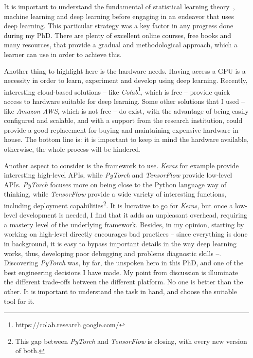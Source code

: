    \par It is important to understand the fundamental of statistical learning theory~\citep{hastie01statisticallearning}, machine learning and deep learning before engaging in an endeavor that uses deep learning. This particular strategy was a key factor in any progress done during my PhD. There are plenty of excellent online courses, free books and many resources, that provide a gradual and methodological approach, which a learner can use in order to achieve this.

    \par Another thing to highlight here is the hardware needs. Having access a GPU is a necessity in order to learn, experiment and develop using deep learning. Recently, interesting cloud-based solutions -- like \textit{Colab}\footnote{\url{https://colab.research.google.com/}}, which is free -- provide quick access to hardware suitable for deep learning. Some other solutions that I used -- like \textit{Amazon AWS}, which is not free -- do exist, with the advantage of being easily configured and scalable, and with a support from the research institution, could provide a good replacement for buying and maintaining expensive hardware in-house. The bottom line is: it is important to keep in mind the hardware available, otherwise, the whole process will be hindered.

    \par Another aspect to consider is the framework to use. \textit{Keras} for example provide interesting high-level APIs, while \textit{PyTorch} and \textit{TensorFlow} provide low-level APIs. \textit{PyTorch} focuses more on being close to the Python language way of thinking, while \textit{TensorFlow} provide a wide variety of interesting functions, including deployment capabilities\footnote{This gap between \textit{PyTorch} and \textit{TensorFlow} is closing, with every new version of both.}. It is lucrative to go for \textit{Keras}, but once a low-level development is needed, I find that it adds an unpleasant overhead, requiring a mastery level of the underlying framework. Besides, in my opinion, starting by working on high-level directly encourages bad practices -- since everything is done in background, it is easy to bypass important details in the way deep learning works, thus, developing poor debugging and problems diagnostic skills --. Discovering \textit{PyTorch} was, by far, the unspoken hero in this PhD, and one of the best engineering decisions I have made. My point from discussion is illuminate the different trade-offs between the different platform. No one is better than the other. It is important to understand the task in hand, and choose the suitable tool for it.

